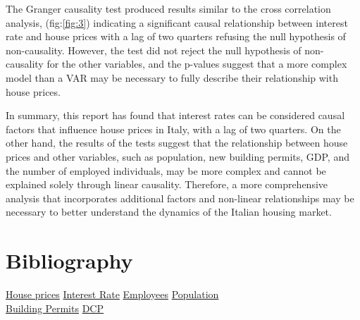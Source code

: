 \documentclass[a4paper,11pt,rmp,superscriptaddress]{report}
\begin{document}
The Granger causality test produced results similar to the cross correlation analysis, (fig:\ref*{fig:3}) indicating a significant causal relationship 
between interest rate and house prices with a lag of two quarters refusing the null hypothesis of non-causality. 
However, the test did not reject the null hypothesis of non-causality for the other variables, 
and the p-values suggest that a more complex model than a VAR may be necessary to fully describe their 
relationship with house prices.

In summary, this report has found that interest rates can be considered causal factors that influence house prices in Italy, with a lag of two quarters. 
On the other hand, the results of the tests suggest that the relationship between house prices and other variables, 
such as population, new building permits, GDP, and the number of employed individuals, 
may be more complex and cannot be explained solely through linear causality. Therefore, a more comprehensive analysis that 
incorporates additional factors and non-linear relationships may be necessary to better understand the dynamics of the Italian 
housing market.
\section*{Bibliography}
\label{section:Bibliography}
    \href{https://fred.stlouisfed.org/series/QITR628BIS}{House prices}
    \href{https://infostat.bancaditalia.it/inquiry/home?spyglass/taxo:CUBESET=/PRINC_IND_00/PRINC_IND_01/PRINC_IND_02/PRINC_IND_02_02&ITEMSELEZ=BAM_MIR.M.1300010.MIR5411.9.950.1000.SBI17.EUR.110.212:true&OPEN=false/&ep:LC=IT&COMM=BANKITALIA&ENV=LIVE&CTX=DIFF&IDX=1&/view:CUBEIDS=BAM_MIR.M.1300010.MIR5411.9.950.1000.SBI17.EUR.110.212} {Interest Rate} 
    \href{http://dati.istat.it/#}{Employees} 
    \href{https://ourworldindata.org/grapher/population}{Population} \\
    \href{http://dati.istat.it/#}{Building Permits} 
    \href{http://dati.istat.it/Index.aspx?DataSetCode=DCCN_PILT}{DCP}
\end{document}
